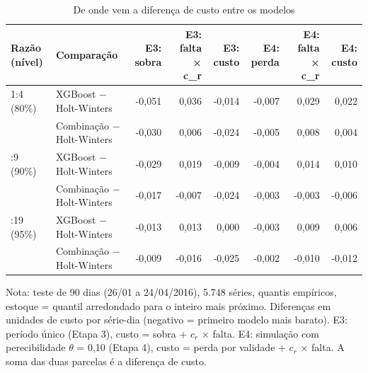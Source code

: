 \begin{table}[htbp]
\centering
\small
\caption{De onde vem a diferença de custo entre os modelos}
\label{tab:mec_decomposicao}
\begin{tabular}{llrrrrrr}
\toprule
Razão (nível) & Comparação & E3: sobra & E3: falta × c\_r & E3: custo & E4: perda & E4: falta × c\_r & E4: custo \\
\midrule
1:4 (80\%) & XGBoost $-$ Holt-Winters & -0,051 & 0,036 & -0,014 & -0,007 & 0,029 & 0,022 \\
 & Combinação $-$ Holt-Winters & -0,030 & 0,006 & -0,024 & -0,005 & 0,008 & 0,004 \\
\addlinespace
1:9 (90\%) & XGBoost $-$ Holt-Winters & -0,029 & 0,019 & -0,009 & -0,004 & 0,014 & 0,010 \\
 & Combinação $-$ Holt-Winters & -0,017 & -0,007 & -0,024 & -0,003 & -0,003 & -0,006 \\
\addlinespace
1:19 (95\%) & XGBoost $-$ Holt-Winters & -0,013 & 0,013 & 0,000 & -0,003 & 0,009 & 0,006 \\
 & Combinação $-$ Holt-Winters & -0,009 & -0,016 & -0,025 & -0,002 & -0,010 & -0,012 \\
\bottomrule
\end{tabular}
\par\smallskip
{\footnotesize Nota: teste de 90 dias (26/01 a 24/04/2016), 5.748 séries, quantis empíricos, estoque = quantil arredondado para o inteiro mais próximo. Diferenças em unidades de custo por série-dia (negativo = primeiro modelo mais barato). E3: período único (Etapa 3), custo = sobra + $c_r$ × falta. E4: simulação com perecibilidade $\theta$ = 0,10 (Etapa 4), custo = perda por validade + $c_r$ × falta. A soma das duas parcelas é a diferença de custo.}
\end{table}
